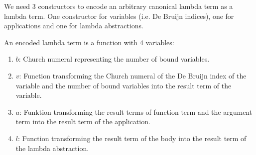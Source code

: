 \documentclass[12pt]{article}
\begin{document}
We need 3 constructors to encode an arbitrary canonical lambda term as a lambda
term. One constructor for variables (i.e. De Bruijn indices), one for
applications and one for lambda abstractions.

An encoded lambda term is a function with 4 variables:
\begin{enumerate}
    \item $b$: Church numeral representing the number of bound variables.

    \item $v$: Function transforming the Church numeral of the De Bruijn index
        of the variable and the number of bound variables into the result term
        of the variable.

    \item $a$: Funktion transforming the result terms of function term and the
        argument term into the result term of the application.

    \item $l$: Function transforming the result term of the body into the result
        term of the lambda abstraction.
\end{enumerate}
\end{document}
